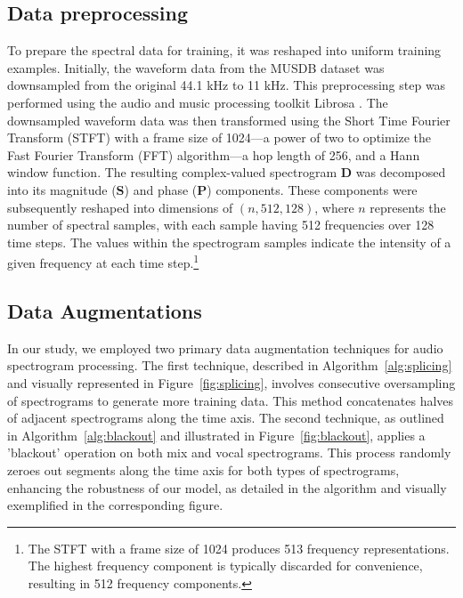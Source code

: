 \documentclass[conference]{IEEEtran}
\begin{document}
\subsection{Data preprocessing}

To prepare the spectral data for training, it was reshaped into uniform training examples. Initially, the waveform data from the MUSDB dataset was downsampled from the original 44.1 kHz to 11 kHz. This preprocessing step was performed using the audio and music processing toolkit Librosa \cite{mcfee_2023_8252662}. The downsampled waveform data was then transformed using the Short Time Fourier Transform (STFT) with a frame size of 1024---a power of two to optimize the Fast Fourier Transform (FFT) algorithm---a hop length of 256, and a Hann window function. The resulting complex-valued spectrogram \( \mathbf{D} \) was decomposed into its magnitude (\( \mathbf{S} \)) and phase (\( \mathbf{P} \)) components. These components were subsequently reshaped into dimensions of \( (n, 512, 128) \), where \( n \) represents the number of spectral samples, with each sample having 512 frequencies over 128 time steps. The values within the spectrogram samples indicate the intensity of a given frequency at each time step.\footnote{The STFT with a frame size of 1024 produces 513 frequency representations. The highest frequency component is typically discarded for convenience, resulting in 512 frequency components.}


\subsection{Data Augmentations}


In our study, we employed two primary data augmentation techniques for audio spectrogram processing. The first technique, described in Algorithm~\ref{alg:splicing} and visually represented in Figure~\ref{fig:splicing}, involves consecutive oversampling of spectrograms to generate more training data. This method concatenates halves of adjacent spectrograms along the time axis. The second technique, as outlined in Algorithm~\ref{alg:blackout} and illustrated in Figure~\ref{fig:blackout}, applies a 'blackout' operation on both mix and vocal spectrograms. This process randomly zeroes out segments along the time axis for both types of spectrograms, enhancing the robustness of our model, as detailed in the algorithm and visually exemplified in the corresponding figure.
\end{document}
